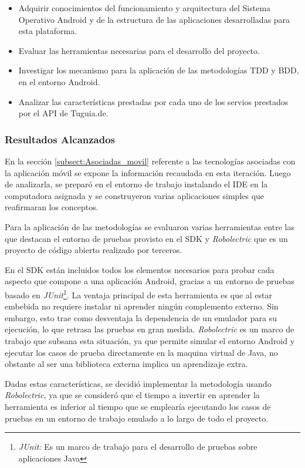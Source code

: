 \begin{itemize}
\item Adquirir conocimientos del funcionamiento y arquitectura del Sistema Operativo Android y de la estructura de las aplicaciones desarrolladas para esta plataforma.
\item Evaluar las herramientas necesarias para el desarrollo del proyecto.
\item Investigar los mecanismo para la aplicación de las metodologías TDD y BDD, en el entorno Android.
\item Analizar las características prestadas por cada uno de los servios prestados por el API de Tuguia.de. 
\end{itemize}

\subsubsection{Resultados Alcanzados}

En la sección \ref{subsect:Asociadas_movil} referente a las tecnologías asociadas con la aplicación móvil se expone la información recaudada en esta iteración. Luego de analizarla, se preparó en el entorno de trabajo instalando el IDE en la computadora asignada y se  construyeron varias aplicaciones simples que reafirmaran los conceptos.

Para la aplicación de las metodologías se evaluaron varias herramientas entre las que destacan el entorno de pruebas provisto en el SDK y \textit{Robolectric} que es un proyecto de código abierto realizado por terceros.

En el SDK están incluidos todos los elementos necesarios para probar cada aspecto que compone a una aplicación Android, gracias a un entorno de pruebas basado en \textit{JUnit}\footnote{\textit{JUnit:} Es un marco de trabajo para el desarrollo de pruebas sobre aplicaciones Java\cite{JUNIT}}. La ventaja principal de esta herramienta es que al estar embebida no requiere instalar ni aprender ningún complemento externo. Sin embargo, esto trae como desventaja la dependencia de un emulador para su ejecución, lo que retrasa las pruebas en gran medida. \textit{Robolectric} es un marco de trabajo que subsana esta situación, ya que permite simular el entorno Android y ejecutar los casos de prueba directamente en la maquina virtual de Java, no obstante al ser una biblioteca externa implica un aprendizaje extra.

Dadas estas características, se decidió implementar la metodología usando \textit{Robolectric}, ya que se consideró que el tiempo a invertir en aprender la herramienta es inferior al tiempo que se emplearía ejecutando los casos de pruebas en un entorno de trabajo emulado a lo largo de todo el proyecto.

